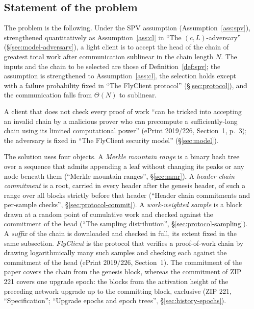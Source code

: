 \documentclass[11pt,a4paper]{article}
\theoremstyle{definition}
\begin{document}
\subsection{Statement of the problem}\label{sec:problem-statement}

The problem is the following. Under the SPV assumption
(Assumption~\ref{ass:spv}), strengthened quantitatively as
Assumption~\ref{ass:cl} in ``The $(c, L)$-adversary''
(\S\ref{sec:model-adversary}), a light client is to accept the head of the
chain of greatest total work after communication sublinear in the chain
length $N$. The inputs and the chain to be selected are those of
Definition~\ref{def:spv}; the assumption is strengthened to
Assumption~\ref{ass:cl}, the selection holds except with a failure
probability fixed in ``The FlyClient protocol'' (\S\ref{sec:protocol}), and
the communication falls from $\Theta(N)$ to sublinear.

A client that does not check every proof of work ``can be tricked into
accepting an invalid chain by a malicious prover who can precompute a
sufficiently-long chain using its limited computational power''
(ePrint 2019/226, Section~1, p.~3); the adversary is fixed in ``The
FlyClient security model'' (\S\ref{sec:model}).

The solution uses four objects. A \emph{Merkle mountain range} is a binary
hash tree over a sequence that admits appending a leaf without changing its
peaks or any node beneath them (``Merkle mountain ranges'', \S\ref{sec:mmr}). A
\emph{header chain commitment} is a root, carried in every header after the
genesis header, of such a range over all blocks strictly before that header
(``Header chain commitments and per-sample checks'',
\S\ref{sec:protocol-commit}). A \emph{work-weighted
sample} is a block drawn at a random point of cumulative work and checked
against the commitment of the head (``The sampling distribution'',
\S\ref{sec:protocol-sampling}). A \emph{suffix} of the chain is downloaded
and checked in full, its extent fixed in the same subsection.
\emph{FlyClient} is the protocol that verifies a proof-of-work chain by
drawing logarithmically many such samples and checking each against the
commitment of the head (ePrint 2019/226, Section~1). The commitment of the
paper covers the chain from the genesis block, whereas the commitment of
ZIP 221 covers one upgrade epoch: the blocks from the activation height of
the preceding network upgrade up to the committing block, exclusive (ZIP 221,
``Specification''; ``Upgrade epochs and epoch trees'',
\S\ref{sec:history-epochs}).
\end{document}

